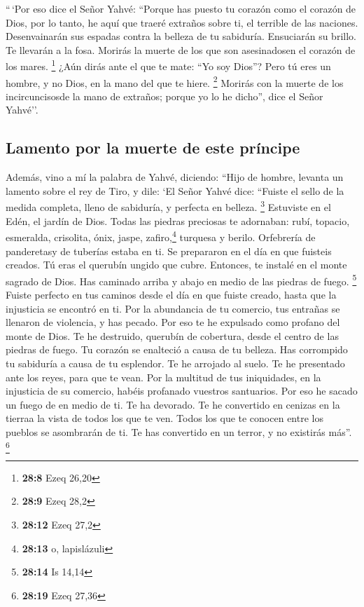  ``\,`Por eso dice el Señor Yahvé: ``Porque has puesto tu
corazón como el corazón de Dios,  por lo tanto, he aquí
que traeré extraños sobre ti, el terrible de las naciones. Desenvainarán
sus espadas contra la belleza de tu sabiduría. Ensuciarán su brillo.
 Te llevarán a la fosa. Morirás la muerte de los que son
asesinadosen el corazón de los mares. \footnote{\textbf{28:8} Ezeq 26,20}
 ¿Aún dirás ante el que te mate: ``Yo soy Dios''? Pero tú
eres un hombre, y no Dios, en la mano del que te hiere. \footnote{\textbf{28:9}
  Ezeq 28,2}  Morirás con la muerte de los
incircuncisosde la mano de extraños; porque yo lo he dicho'', dice el
Señor Yahvé''.

\hypertarget{lamento-por-la-muerte-de-este-pruxedncipe}{%
\subsection{Lamento por la muerte de este
príncipe}\label{lamento-por-la-muerte-de-este-pruxedncipe}}

 Además, vino a mí la palabra de Yahvé, diciendo:
 ``Hijo de hombre, levanta un lamento sobre el rey de
Tiro, y dile: `El Señor Yahvé dice: ``Fuiste el sello de la medida
completa, lleno de sabiduría, y perfecta en belleza. \footnote{\textbf{28:12}
  Ezeq 27,2}  Estuviste en el Edén, el jardín de Dios.
Todas las piedras preciosas te adornaban: rubí, topacio, esmeralda,
crisolita, ónix, jaspe, zafiro,\footnote{\textbf{28:13} o, lapislázuli}
turquesa y berilo. Orfebrería de panderetasy de tuberías estaba en ti.
Se prepararon en el día en que fuisteis creados.  Tú eras
el querubín ungido que cubre. Entonces, te instalé en el monte sagrado
de Dios. Has caminado arriba y abajo en medio de las piedras de fuego.
\footnote{\textbf{28:14} Is 14,14}  Fuiste perfecto en
tus caminos desde el día en que fuiste creado, hasta que la injusticia
se encontró en ti.  Por la abundancia de tu comercio, tus
entrañas se llenaron de violencia, y has pecado. Por eso te he expulsado
como profano del monte de Dios. Te he destruido, querubín de cobertura,
desde el centro de las piedras de fuego.  Tu corazón se
enalteció a causa de tu belleza. Has corrompido tu sabiduría a causa de
tu esplendor. Te he arrojado al suelo. Te he presentado ante los reyes,
para que te vean.  Por la multitud de tus iniquidades, en
la injusticia de su comercio, habéis profanado vuestros santuarios. Por
eso he sacado un fuego de en medio de ti. Te ha devorado. Te he
convertido en cenizas en la tierraa la vista de todos los que te ven.
 Todos los que te conocen entre los pueblos se asombrarán
de ti. Te has convertido en un terror, y no existirás más''. \footnote{\textbf{28:19}
  Ezeq 27,36}

